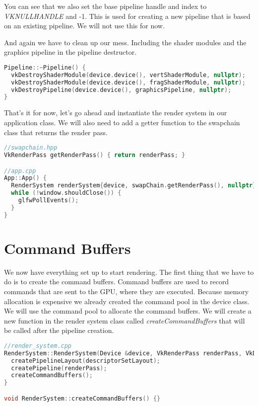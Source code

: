 \documentclass[12pt]{report} \usepackage{preamble}
\begin{document}
You can see that we also set the base pipeline handle and index to \textit{VK\textunderscore NULL\textunderscore HANDLE}
and -1. This is used for creating a new pipeline that is based on an existing pipeline. We will not use this for now.

And again we have to clean up our mess. Including the shader modules and the graphics pipeline in the pipeline destructor.

\begin{lstlisting}[language=C++]
Pipeline::~Pipeline() {
  vkDestroyShaderModule(device.device(), vertShaderModule, nullptr);
  vkDestroyShaderModule(device.device(), fragShaderModule, nullptr);
  vkDestroyPipeline(device.device(), graphicsPipeline, nullptr);
}
\end{lstlisting}

That's it for now, let's go ahead and instantiate the render system in our application class.
We will also need to add a getter function to the swapchain class that returns the render pass.

\begin{lstlisting}[language=C++]
//swapchain.hpp
VkRenderPass getRenderPass() { return renderPass; }

//app.cpp
App::App() {
  RenderSystem renderSystem{device, swapChain.getRenderPass(), nullptr};
  while (!window.shouldClose()) {
    glfwPollEvents();
  }
}
\end{lstlisting}

\section{Command Buffers}

We now have everything set up to start rendering. The first thing that we have to do is to create the command buffers.
Command buffers are used to record commands that are sent to the GPU, where they are executed. Because memory allocation
is expensive we already created the command pool in the device class. We will use the command pool to allocate the command
buffers. We will create a new function in the render system class called \textit{createCommandBuffers} that will be called
after the pipeline creation.

\begin{lstlisting}[language=C++]
//render_system.cpp
RenderSystem::RenderSystem(Device &device, VkRenderPass renderPass, VkDescriptorSetLayout descriptorSetLayout) : device{device} {
  createPipelineLayout(descriptorSetLayout);
  createPipeline(renderPass);
  createCommandBuffers();
}

void RenderSystem::createCommandBuffers() {}
\end{lstlisting}
\end{document}
